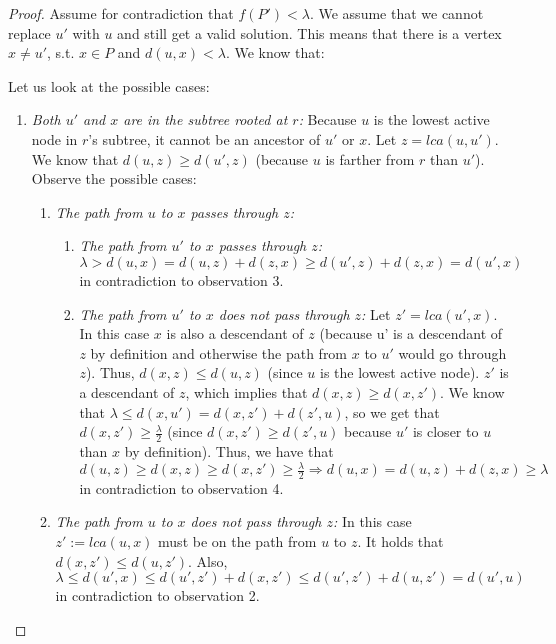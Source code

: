 \documentclass[11pt,a4paper]{article}
\theoremstyle{definition}
\theoremstyle{remark}
\begin{document}
\begin{proof}
Assume for contradiction that $f(P')<\lambda$. We assume that we cannot replace $u'$ with $u$ and still get a valid solution. This means that there is a vertex $x \neq u'$, s.t. $x\in P$ and $d(u,x)<\lambda$. 
We know that:
\\ {\normalfont Let us look at the possible cases:
\begin{enumerate}
\item \textit{Both $u'$ and $x$ are in the subtree rooted at $r$:}
Because $u$ is the lowest active node in $r$'s subtree, it cannot be an ancestor of $u'$ or $x$.
Let $z=lca(u,u')$. We know that $d(u,z)\geq d(u',z)$ (because $u$ is farther from $r$ than $u'$). Observe the possible cases:
\begin{enumerate}
\item \emph{The path from $u$ to $x$ passes through $z$:}
\begin{enumerate}
\item \emph{The path from $u'$ to $x$ passes through $z$:}
$\lambda> d(u,x) = d(u,z) + d(z,x) \geq d(u',z)+d(z,x) = d(u',x)$ in contradiction to observation 3.
\item \emph{The path from $u'$ to $x$ does not pass through $z$:}
Let $z'=lca(u',x)$. In this case $x$ is also a descendant of $z$ (because u' is a descendant of $z$ by definition and otherwise the path from $x$ to $u'$ would go through $z$). Thus, $d(x,z) \leq d(u,z)$ (since $u$ is the lowest active node). $z'$ is a descendant of $z$, which implies that $d(x,z) \geq d(x,z')$. We know that $\lambda \leq d(x,u') = d(x,z')+d(z',u)$, so we get that $d(x,z') \geq \frac{\lambda}{2}$ (since $d(x,z')\geq d(z',u)$ because $u'$ is closer to $u$ than $x$ by definition). Thus, we have that $d(u,z) \geq d(x,z) \geq d(x,z')\geq \frac{\lambda}{2} \Rightarrow d(u,x) = d(u,z)+d(z,x) \geq \lambda$ in contradiction to observation 4.
\end{enumerate}
\item \emph{The path from $u$ to $x$ does not pass through $z$:}
In this case $z':=lca(u,x)$ must be on the path from $u$ to $z$. It holds that $d(x,z')\leq d(u,z')$.
Also, $\lambda \leq d(u',x) \leq d(u',z')+d(x,z') \leq d(u',z')+d(u,z') = d(u',u)$ in contradiction to observation 2.
\end{enumerate}


\end{enumerate}}
\end{proof}
\end{document}
